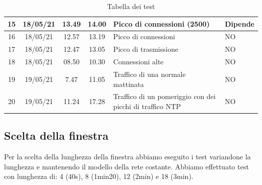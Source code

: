 \begin{table}
\begin{tabularx}{\textwidth}{||c c c c X X||}
        15 & 18/05/21 & 13.49 & 14.00 & Picco di connessioni (2500) & Dipende \\ %
        \hline 
        16 & 18/05/21 & 12.57 & 13.19 & Picco di connessioni & NO\\        
        \hline
        17 & 18/05/21 & 12.47 & 13.05 & Picco di trasmissione & NO\\        
        \hline
        18 & 18/05/21 & 08.50 & 10.30 & Connessioni alte & NO\\
        \hline
        19 & 19/05/21 & 7.47 & 11.05 & Traffico di una normale mattinata & NO\\ 
        \hline
        20 & 19/05/21 & 11.24 & 17.28 & Traffico di un pomeriggio con dei picchi di traffico NTP & NO\\ 
        \hline
    \end{tabularx}
    \caption{Tabella dei test}
    \label{table:test}
\end{table}

\subsection{Scelta della finestra}

Per la scelta della lunghezza della finestra abbiamo eseguito i test variandone la lunghezza e mantenendo il modello della rete costante.
Abbiamo effettuato test con lunghezza di: 4 (40s), 8 (1min20), 12 (2min) e 18 (3min).

